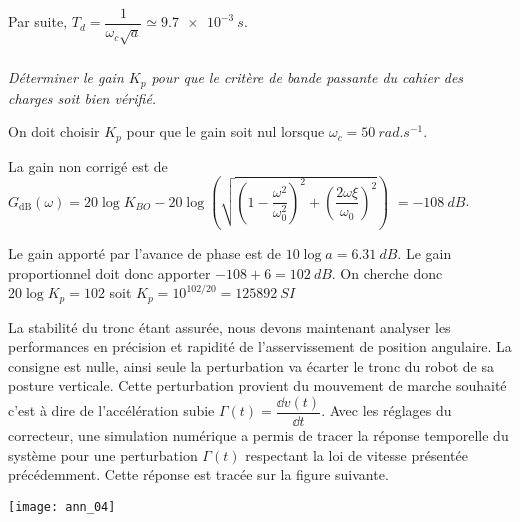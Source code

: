 \begin{multicols}{2}
\begin{corrige}
Par suite, $T_d = \dfrac{1}{\omega_c\sqrt{a}}\simeq \SI{9,7e-3}{s}$.


%
%
 

\end{corrige}
\else
\fi


\subparagraph{} \textit{Déterminer le gain $K_p$ pour que le critère de bande passante du cahier des charges soit bien vérifié.}
\ifprof
\begin{corrige}
On doit choisir $K_p$ pour que le gain soit nul lorsque $\omega_c = \SI{50}{rad.s^{-1}}$. 

La gain non corrigé est de $G_{\text{dB}}(\omega)=20\log K_{BO} - 20 \log \left( \sqrt{\left( 1-\dfrac{\omega^2}{\omega_0^2}\right)^2+\left( \dfrac{2\omega\xi}{\omega_0}\right)^2}\right)$
$=\SI{-108}{dB}$.

Le gain apporté par l'avance de phase est de $10\log a=\SI{6,31}{dB}$. Le gain proportionnel doit donc apporter $-108+6=\SI{102}{dB}$. On cherche donc $20\log K_p = 102$ soit $K_p = 10^{102/20}=\SI{125892}{SI}$
\end{corrige}
\else
\fi
\ifprof
\else
La stabilité du tronc étant assurée, nous devons maintenant analyser les performances en précision et rapidité
de l'asservissement de position angulaire. La consigne est nulle, ainsi seule la perturbation va écarter le tronc
du robot de sa posture verticale. Cette perturbation provient du mouvement de marche souhaité c'est à dire de
l'accélération subie $\Gamma(t)=\dfrac{\dd v(t)}{\dd t}$. Avec les réglages du correcteur, une simulation numérique a permis de tracer la réponse temporelle du système pour une perturbation $\Gamma(t)$ respectant la loi de vitesse présentée précédemment.
Cette réponse est tracée sur la figure suivante.

\begin{center}
\texttt{[image: ann\_04]}
\end{center}
\fi



\end{multicols}
